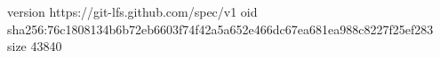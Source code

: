 version https://git-lfs.github.com/spec/v1
oid sha256:76c1808134b6b72eb6603f74f42a5a652e466dc67ea681ea988c8227f25ef283
size 43840
